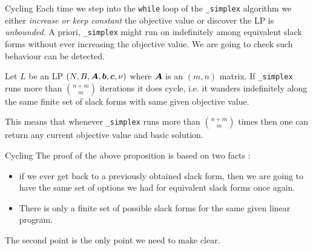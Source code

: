 \documentclass[aspectratio = 169]{beamer}
\begin{document}
\begin{frame}{Cycling}
  Each time we step into the \texttt{while} loop of the
  \texttt{_simplex} algorithm we either \textit{increase or keep
    constant} the objective value or discover the LP is
  \textit{unbounded}. A priori, \texttt{_simplex} might run
  on indefinitely among equivalent slack forms without ever increasing
  the objective value. We are going to check such behaviour can be
  detected.
  \pause
    \begin{prop}[\textbf{C}]
      Let $L$ be an LP $(N, B, \boldsymbol{A}, \boldsymbol{b}, \boldsymbol{c}, \nu)$ where
      $\boldsymbol{A}$ is an $(m, n)$ matrix. If \texttt{_simplex}
      runs more than $\binom{n+m}{m}$ iterations it does cycle,
      i.e. it wanders indefinitely along the same finite set of slack
      forms with same given objective value.
    \end{prop}
    \begin{rem}
      This means that whenever \texttt{_simplex} runs more
      than $\binom{n+m}{m}$ times then one can return any current
      objective value and basic solution.
    \end{rem}
    \end{frame}

    \begin{frame}{Cycling}
        The proof of the above proposition is based on two facts :
        \begin{itemize}
        \item if we ever get back to a previously obtained slack form,
          then we are going to have the same set of options we had for
          equivalent slack forms once again.
        \item There is only a finite set of possible slack forms for
          the same given linear program.
        \end{itemize}
        \pause
        The second point is the only point we need to make clear.
    \end{frame}
\end{document}
